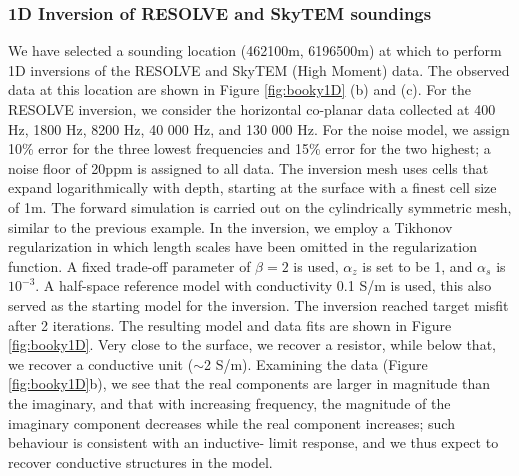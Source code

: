 \subsubsection{1D Inversion of RESOLVE and SkyTEM soundings}

We have selected a sounding location (462100m, 6196500m) at which to perform
1D inversions of the RESOLVE and SkyTEM (High Moment) data. The observed data
at this location are shown in Figure \ref{fig:booky1D} (b) and (c). For the RESOLVE inversion, we
consider the horizontal co-planar data collected at 400 Hz, 1800 Hz, 8200 Hz,
40 000 Hz, and 130 000 Hz. For the noise model, we assign 10\% error for the
three lowest frequencies and 15\% error for the two highest; a noise floor of
20ppm is assigned to all data. The inversion mesh uses cells that expand
logarithmically with depth, starting at the surface with a finest cell size of 1m. The forward
simulation is carried out on the cylindrically symmetric mesh, similar to the
previous example. In the inversion, we employ a Tikhonov regularization in
which length scales have been omitted in the regularization function. A fixed
trade-off parameter of $\beta = 2$ is used, $\alpha_z$ is set to be 1, and
$\alpha_s$ is ${10^{-3}}$. A half-space reference model with conductivity 0.1
S/m is used, this also served as the starting model for the inversion. The
inversion reached target misfit after 2 iterations. The resulting model and
data fits are shown in Figure \ref{fig:booky1D}. Very close to the surface, we
recover a resistor, while below that, we recover a conductive unit ($\sim$2
S/m). Examining the data (Figure \ref{fig:booky1D}b), we see that the real
components are larger in magnitude than the imaginary, and that with
increasing frequency, the magnitude of the imaginary component decreases while
the real component increases; such behaviour is consistent with an inductive-
limit response, and we thus expect to recover conductive structures in the
model.

